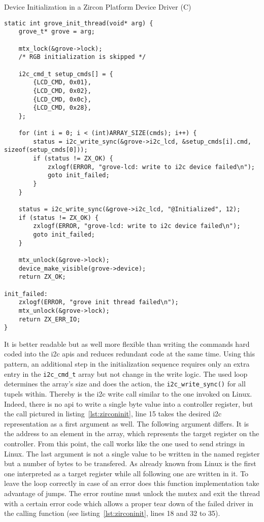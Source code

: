 \begin{listing} [H]
    \caption{Device Initialization in a Zircon Platform Device Driver (C)}
\label{lst:zirconinit}
\begin{verbatim}
static int grove_init_thread(void* arg) {
    grove_t* grove = arg;

    mtx_lock(&grove->lock);
    /* RGB initialization is skipped */

    i2c_cmd_t setup_cmds[] = {
        {LCD_CMD, 0x01},
        {LCD_CMD, 0x02},
        {LCD_CMD, 0x0c},
        {LCD_CMD, 0x28},
    };

    for (int i = 0; i < (int)ARRAY_SIZE(cmds); i++) {
        status = i2c_write_sync(&grove->i2c_lcd, &setup_cmds[i].cmd, sizeof(setup_cmds[0]));
        if (status != ZX_OK) {
            zxlogf(ERROR, "grove-lcd: write to i2c device failed\n");
            goto init_failed;
        }
    }

    status = i2c_write_sync(&grove->i2c_lcd, "@Initialized", 12);
    if (status != ZX_OK) {
        zxlogf(ERROR, "grove-lcd: write to i2c device failed\n");
        goto init_failed;
    }

    mtx_unlock(&grove->lock);
    device_make_visible(grove->device);
    return ZX_OK;

init_failed:
    zxlogf(ERROR, "grove init thread failed\n");
    mtx_unlock(&grove->lock);
    return ZX_ERR_IO;
}
\end{verbatim}
\end{listing}

It is better readable but as well more flexible than writing the commands hard coded into the \ac{i2c} \acp{api} and reduces redundant code at the same time.
Using this pattern, an additional step in the initialization sequence requires only an extra entry in the \texttt{i2c_cmd_t} array but not change in the write logic.
The used loop determines the array's size and does the action, the \texttt{i2c_write_sync()} for all tupels within.
Thereby is the \ac{i2c} write call similar to the one invoked on Linux.
Indeed, there is no \ac{api} to write a single byte value into a controller register, but the call pictured in listing~\ref{lst:zirconinit}, line 15 takes the desired \ac{i2c} representation as a first argument as well.
The following argument differs.
It is the address to an element in the array, which represents the target register on the controller.
From this point, the call works like the one used to send strings in Linux.
The last argument is not a single value to be written in the named register but a number of bytes to be transfered.
As already known from Linux is the first one interpreted as a target register while all following one are written in it.
To leave the loop correctly in case of an error does this function implementation take advantage of jumps.
The error routine must unlock the mutex and exit the thread with a certain error code which allows a proper tear down of the failed driver in the calling function (see listing~\ref{lst:zirconinit}, lines 18 and 32 to 35).

